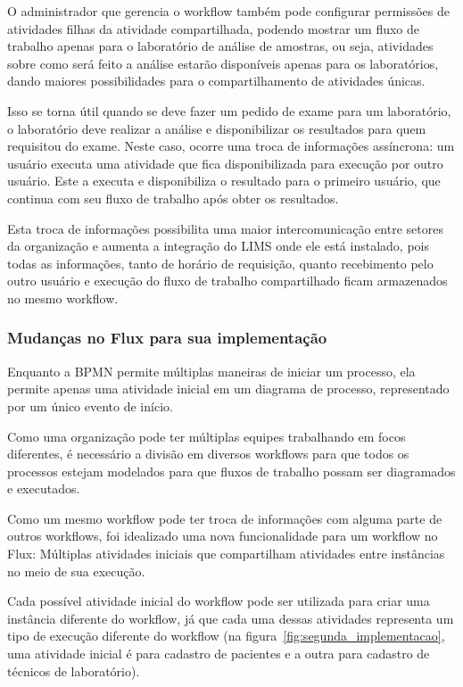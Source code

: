 O administrador que gerencia o workflow também pode configurar permissões de atividades filhas da atividade compartilhada, podendo mostrar um fluxo de trabalho apenas para o laboratório de análise de amostras, ou seja, atividades sobre como será feito a análise estarão disponíveis apenas para os laboratórios, dando maiores possibilidades para o compartilhamento de atividades únicas.

Isso se torna útil quando se deve fazer um pedido de exame para um laboratório, o laboratório deve realizar a análise e disponibilizar os resultados para quem requisitou do exame. Neste caso, ocorre uma troca de informações assíncrona: um usuário executa uma atividade que fica disponibilizada para execução por outro usuário. Este a executa e disponibiliza o resultado para o primeiro usuário, que continua com seu fluxo de trabalho após obter os resultados.

Esta troca de informações possibilita uma maior intercomunicação entre setores da organização e aumenta a integração do LIMS onde ele está instalado, pois todas as informações, tanto de horário de requisição, quanto recebimento pelo outro usuário e execução do fluxo de trabalho compartilhado ficam armazenados no mesmo workflow.

\subsubsection{Mudanças no Flux para sua implementação}

Enquanto a BPMN permite múltiplas maneiras de iniciar um processo, ela permite apenas uma atividade inicial em um diagrama de processo, representado por um único evento de início.

Como uma organização pode ter múltiplas equipes trabalhando em focos diferentes, é necessário a divisão em diversos workflows para que todos os processos estejam modelados para que fluxos de trabalho possam ser diagramados e executados.

Como um mesmo workflow pode ter troca de informações com alguma parte de outros workflows, foi idealizado uma nova funcionalidade para um workflow no Flux: Múltiplas atividades iniciais que compartilham atividades entre instâncias no meio de sua execução.

Cada possível atividade inicial do workflow pode ser utilizada para criar uma instância diferente do workflow, já que cada uma dessas atividades representa um tipo de execução diferente do workflow (na figura~\ref{fig:segunda_implementacao}, uma atividade inicial é para cadastro de pacientes e a outra para cadastro de técnicos de laboratório).

